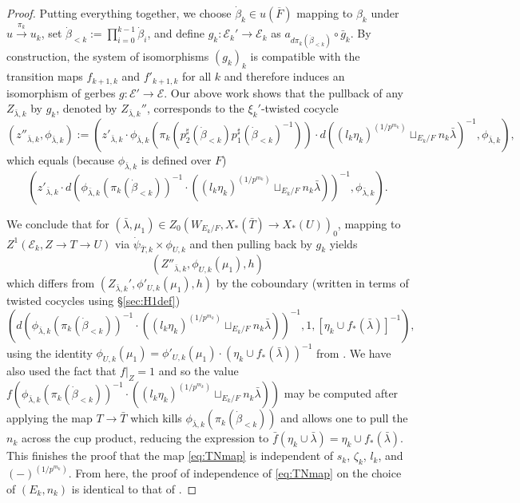 \documentclass{amsart}
\theoremstyle{definition}
\theoremstyle{remark}
\newcommand{\ov}{\overline}
\begin{document}
\begin{proof}
Putting everything together, we choose $\dot{\beta}_{k} \in u(\ov{F})$ mapping to $\beta_{k}$ under $u \xrightarrow{\pi_{k}} u_{k}$, set $\dot{\beta}_{<k} := \prod_{i=0}^{k-1} \dot{\beta}_{i}$, and define $g_{k} \colon \mathcal{E}_{k}' \to \mathcal{E}_{k}$ as $a_{d\pi_{k}(\dot{\beta}_{<k})} \circ \bar{g}_{k}$. By construction, the system of isomorphisms $(g_{k})_{k}$ is compatible with the transition maps $f_{k+1,k}$ and $f'_{k+1,k}$ for all $k$ and therefore induces an isomorphism of gerbes $g \colon \mathcal{E}' \to \mathcal{E}$. Our above work shows that the pullback of any $Z_{\bar{\lambda},k}$ by $g_{k}$, denoted by $Z_{\bar{\lambda},k}''$, corresponds to the $\xi_{k}'$-twisted cocycle
\begin{equation*}
    (z''_{\bar{\lambda},k}, \phi_{\bar{\lambda},k}):=(z'_{\bar{\lambda},k} \cdot \phi_{\bar{\lambda},k}(\pi_{k}(p_{2}^{\sharp}(\dot{\beta}_{<k})p_{1}^{\sharp}(\dot{\beta}_{<k})^{-1})) \cdot d((l_{k}\eta_{k})^{(1/p^{m_{k}})} \sqcup_{E_{k}/F} n_{k}\bar{\lambda})^{-1},\phi_{\bar{\lambda},k}),
\end{equation*}
which equals (because $\phi_{\bar{\lambda},k}$ is defined over $F$)
\begin{equation*}
     (z'_{\bar{\lambda},k} \cdot d(\phi_{\bar{\lambda},k}(\pi_{k}(\dot{\beta}_{<k}))^{-1} \cdot ((l_{k}\eta_{k})^{(1/p^{m_{k}})} \sqcup_{E_{k}/F} n_{k}\bar{\lambda}))^{-1},\phi_{\bar{\lambda},k}).
\end{equation*}

We conclude that for $(\bar{\lambda},\mu_{1}) \in Z_{0}(W_{E_{k}/F},X_{*}(\bar{T}) \to X_{*}(U))_{0}$, mapping to $Z^{1}(\mathcal{E}_{k}, Z \to T \to U)$ via $\dot{\psi}_{\bar{T},k} \times \phi_{U,k}$ and then pulling back by $g_{k}$ yields 
\begin{equation*}
(Z''_{\bar{\lambda},k}, \phi_{U,k}(\mu_{1}),h)
\end{equation*}
which differs from $(Z_{\bar{\lambda},k}', \phi'_{U,k}(\mu_{1}),h)$ by the coboundary (written in terms of twisted cocycles using \S \ref{sec:H1def})
\begin{equation*}
(d(\phi_{\bar{\lambda},k}(\pi_{k}(\dot{\beta}_{<k}))^{-1} \cdot ((l_{k}\eta_{k})^{(1/p^{m_{k}})} \sqcup_{E_{k}/F} n_{k}\bar{\lambda}))^{-1},1,[\eta_{k}\cup f_{*}(\bar{\lambda})]^{-1}),
\end{equation*}
using the identity $\phi_{U,k}(\mu_{1}) = \phi'_{U,k}(\mu_{1}) \cdot(\eta_{k} \cup f_{*}(\bar{\lambda}))^{-1}$ from \cite[\S A.3]{KS99}. We have also used the fact that $f|_{Z}=1$ and so the value $f(\phi_{\bar{\lambda},k}(\pi_{k}(\dot{\beta}_{<k}))^{-1} \cdot ((l_{k}\eta_{k})^{(1/p^{m_{k}})} \sqcup_{E_{k}/F} n_{k}\bar{\lambda}))$ may be computed after applying the map $T \to \bar{T}$ which kills $\phi_{\bar{\lambda},k}(\pi_{k}(\dot{\beta}_{<k}))$ and allows one to pull the $n_{k}$ across the cup product, reducing the expression to $\bar{f}(\eta_{k} \cup \bar{\lambda}) = \eta_{k} \cup f_{*}(\bar{\lambda})$. This finishes the proof that the map \eqref{eq:TNmap} is independent of $s_{k}$, $\zeta_{k}$, $l_{k}$, and $(-)^{(1/p^{m_{k}})}$. From here, the proof of independence of \eqref{eq:TNmap} on the choice of $(E_{k},n_{k})$ is identical to that of \cite{Kal26b}.
\end{proof}
\end{document}
